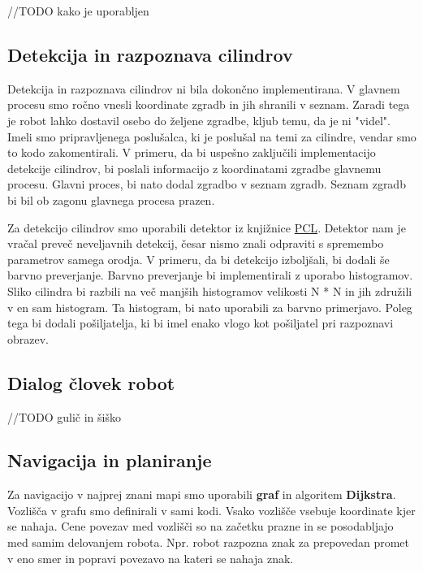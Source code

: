 \documentclass[a4paper,11pt]{article}
\begin{document}
//TODO kako je uporabljen

\subsection{Detekcija in razpoznava cilindrov}

Detekcija in razpoznava cilindrov ni bila dokončno implementirana. V glavnem procesu smo ročno vnesli koordinate zgradb in jih shranili v seznam. Zaradi tega je robot lahko dostavil osebo do željene zgradbe, kljub temu, da je ni "videl". Imeli smo pripravljenega poslušalca, ki je poslušal na temi za cilindre, vendar smo to kodo zakomentirali. V primeru, da bi uspešno zaključili implementacijo detekcije cilindrov, bi poslali informacijo z koordinatami zgradbe glavnemu procesu. Glavni proces, bi nato dodal zgradbo v seznam zgradb. Seznam zgradb bi bil ob zagonu glavnega procesa prazen.

Za detekcijo cilindrov smo uporabili detektor iz knjižnice \href{http://pointclouds.org/documentation/tutorials/cylinder_segmentation.php}{PCL}. Detektor nam je vračal preveč neveljavnih detekcij, česar nismo znali odpraviti s spremembo parametrov samega orodja. V primeru, da bi detekcijo izboljšali, bi dodali še barvno preverjanje. Barvno preverjanje bi implementirali z uporabo histogramov. Sliko cilindra bi razbili na več manjših histogramov velikosti N * N in jih združili v en sam histogram. Ta histogram, bi nato uporabili za barvno primerjavo. Poleg tega bi dodali pošiljatelja, ki bi imel enako vlogo kot pošiljatel pri razpoznavi obrazev.

\subsection{\label{sec:dialog} Dialog človek robot}

//TODO gulič in šiško

\subsection{Navigacija in planiranje}

Za navigacijo v najprej znani mapi smo uporabili \textbf{graf} in algoritem \textbf{Dijkstra}. Vozlišča v grafu smo definirali v sami kodi. Vsako vozlišče vsebuje koordinate kjer se nahaja. Cene povezav med vozlišči so na začetku prazne in se posodabljajo med samim delovanjem robota. Npr. robot razpozna znak za prepovedan promet
v eno smer in popravi povezavo na kateri se nahaja znak.
\end{document}
